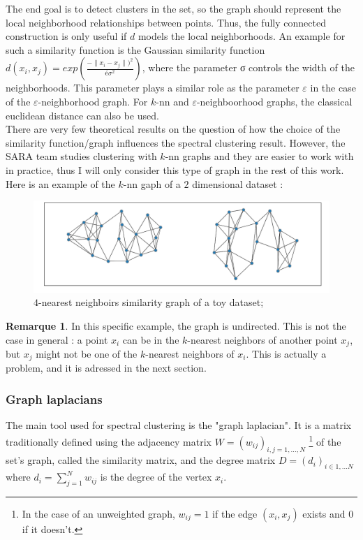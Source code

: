 \documentclass[a4paper,12pt]{article}
\theoremstyle{definition}
\newtheorem*{rem}{Remarque}
\theoremstyle{plain}
\begin{document}
The end goal is to detect clusters in the set, so the graph should represent the local neighborhood relationships between points. Thus, the fully connected construction is only useful if $d$ models the local neighborhoods. An example for such a similarity function is the Gaussian similarity function $d(x_i,x_j)=exp(\frac{-\lVert x_i - x_j \rVert)^2}{é\sigma^2})$, where the parameter σ controls the width of the neighborhoods. This parameter plays a similar role as the parameter $\varepsilon$ in the case of the $\varepsilon$-neighborhood graph.
For $k$-nn and $\varepsilon$-neighboorhood graphs, the classical euclidean distance can also be used.\\

There are very few theoretical results on the question of how the choice of the similarity function/graph influences the spectral clustering result. However, the SARA team studies clustering with $k$-nn graphs and they are easier to work with in practice, thus I will only consider this type of graph in the rest of this work.
Here is an example of the $k$-nn gaph of a $2$ dimensional dataset :

\begin{figure}[H]
	\centering
	\includegraphics[width=0.6\linewidth]{figures/simgraph_example}
	\caption{$4$-nearest neighboirs similarity graph of a toy dataset;}
	\label{fig:sg_example}
\end{figure}
\begin{rem}
	In this specific example, the graph is undirected. This is not the case in general : a point $x_i$ can be in the $k$-nearest neighbors of another point $x_j$, but $x_j$ might not be one of the $k$-nearest neighbors of $x_i$. This is actually a problem, and it is adressed in the next section.
\end{rem}
\subsubsection{Graph laplacians}
The main tool used for spectral clustering is the "graph laplacian". It is a matrix traditionally defined using the adjacency matrix $W=(w_{ij})_{i,j=1,\ldots,N}$ \footnote{In the case of an unweighted graph, $w_{ij}=1$ if the edge $(x_i,x_j)$ exists and $0$ if it doesn't.} of the set's graph, called the similarity matrix, and the degree matrix $D=(d_i)_{i \in {1,\ldots N}}$ where $d_i=\sum_{j=1}^{N}w_{ij}$ is the degree of the vertex $x_i$.
\end{document}

